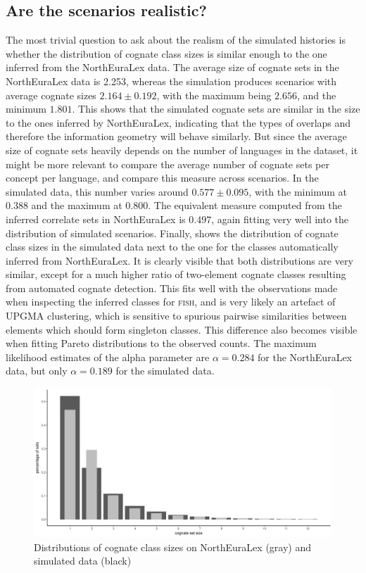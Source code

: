 \subsection{Are the scenarios realistic?}
The most trivial question to ask about the realism of the simulated histories is whether the distribution of cognate class sizes is similar enough to the one inferred from the NorthEuraLex data. The average size of cognate sets in the NorthEuraLex data is 2.253, whereas the simulation produces scenarios with average cognate sizes $2.164 \pm 0.192$, with the maximum being $2.656$, and the minimum $1.801$. This shows that the simulated cognate sets are similar in the size to the ones inferred by NorthEuraLex, indicating that the types of overlaps and therefore the information geometry will behave similarly. But since the average size of cognate sets heavily depends on the number of languages in the dataset, it might be more relevant to compare the average number of cognate sets per concept per language, and compare this measure across scenarios. In the simulated data, this number varies around $0.577 \pm 0.095$, with the minimum at $0.388$ and the maximum at $0.800$. The equivalent measure computed from the 
inferred correlate sets in NorthEuraLex is $0.497$, again fitting very well into the distribution of simulated scenarios. Finally,  shows the distribution of cognate class sizes in the simulated data next to the one for the classes automatically inferred from NorthEuraLex. It is clearly visible that both distributions are very similar, except for a much higher ratio of two-element cognate classes resulting from automated cognate detection. This fits well with the observations made when inspecting the inferred classes for \textsc{fish}, and is very likely an artefact of UPGMA clustering, which is sensitive to spurious pairwise similarities between elements which should form singleton classes. This difference also becomes visible when fitting Pareto distributions to the observed counts. The maximum likelihood estimates of the alpha parameter are $\alpha = 0.284$ for the NorthEuraLex data, but only $\alpha = 0.189$ for the simulated data. 

\begin{figure}
 \begin{center}
 \includegraphics[width=\textwidth]{figures/cognate-set-sizes.pdf}
 \caption{Distributions of cognate class sizes on NorthEuraLex (gray) and simulated data (black)}
 \label{cognate-class-sizes}
 \end{center}
\end{figure}

